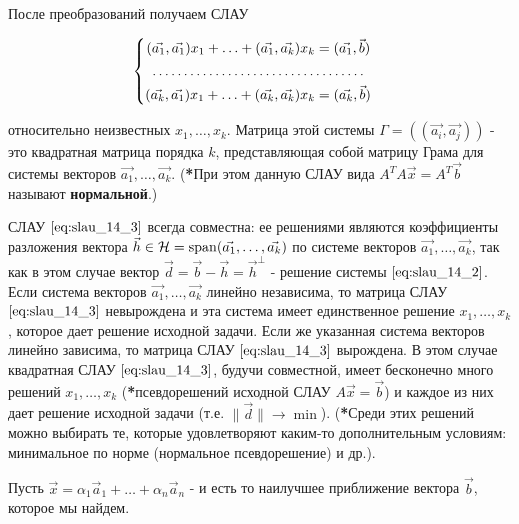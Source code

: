 \bigbreak

После преобразований получаем СЛАУ

\begin{equation}
    \begin{cases}
        \begin{aligned}
            (\vec{a_1}, \vec{a_1}) x_1 + \ldots + (\vec{a_1}, \vec{a_k})x_k &= (\vec{a_1}, \vec{b}) \\
            \hdotsfor{2} \\
            (\vec{a_k}, \vec{a_1}) x_1 + \ldots + (\vec{a_k}, \vec{a_k})x_k &= (\vec{a_k}, \vec{b}) \\
        \end{aligned}
    \end{cases}
    \label{eq:slau_14_3}
\end{equation}

относительно неизвестных $x_1, \ldots, x_k$. Матрица этой системы $\Gamma = ((\vec{a_i}, \vec{a_j}))$ - это квадратная матрица порядка $k$, представляющая собой матрицу Грама для системы векторов $\vec{a_1}, \ldots, \vec{a_k}$. (\textbf{*}При этом данную СЛАУ вида $A^TA\vec{x} = A^T\vec{b}$ называют \textbf{нормальной}.)

СЛАУ $\eqref{eq:slau_14_3}$ всегда совместна: ее решениями являются коэффициенты разложения вектора $\vec{h} \in \mathcal{H} = \operatorname{\mathop{\mathrm{span}}}(\vec{a_1}, \ldots, \vec{a_k})$ по системе векторов $\vec{a_1}, \ldots, \vec{a_k}$, так как в этом случае вектор $\vec{d} = \vec{b} - \vec{h} = \vec{h}^\perp$ - решение системы $\eqref{eq:slau_14_2}$. Если система векторов $\vec{a_1}, \ldots, \vec{a_k}$ линейно независима, то матрица СЛАУ $\eqref{eq:slau_14_3}$ невырождена и эта система имеет единственное решение $x_1, \ldots, x_k$, которое дает решение исходной задачи. Если же указанная система векторов линейно зависима, то матрица СЛАУ $\eqref{eq:slau_14_3}$ вырождена. В этом случае квадратная СЛАУ $\eqref{eq:slau_14_3}$, будучи совместной, имеет бесконечно много решений $x_1, \ldots, x_k$ (\textbf{*}псевдорешений исходной СЛАУ $A\vec{x} = \vec{b}$) и каждое из них дает решение исходной задачи (т.е. $\lVert \vec{d} \rVert \to \min$). (\textbf{*}Среди этих решений можно выбирать те, которые удовлетворяют каким-то дополнительным условиям: минимальное по норме (нормальное псевдорешение) и др.).

\bigbreak

Пусть $\vec{x} = \alpha_1\vec{a}_1 + \ldots + \alpha_n\vec{a}_n$ - и есть то наилучшее приближение вектора $\vec{b}$, которое мы найдем.

